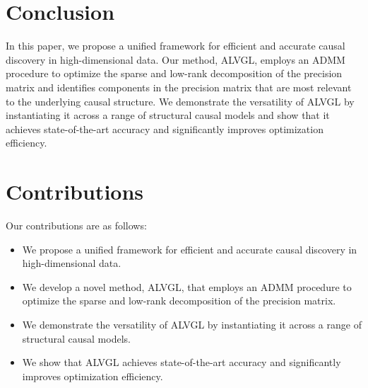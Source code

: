 \documentclass{article}
\begin{document}
        \section{Conclusion}
        In this paper, we propose a unified framework for efficient and accurate causal discovery in high-dimensional data. Our method, ALVGL, employs an ADMM procedure to optimize the sparse and low-rank decomposition of the precision matrix and identifies components in the precision matrix that are most relevant to the underlying causal structure. We demonstrate the versatility of ALVGL by instantiating it across a range of structural causal models and show that it achieves state-of-the-art accuracy and significantly improves optimization efficiency.

        \section{Contributions}
        Our contributions are as follows:

        \begin{itemize}
        \item We propose a unified framework for efficient and accurate causal discovery in high-dimensional data.
        \item We develop a novel method, ALVGL, that employs an ADMM procedure to optimize the sparse and low-rank decomposition of the precision matrix.
        \item We demonstrate the versatility of ALVGL by instantiating it across a range of structural causal models.
        \item We show that ALVGL achieves state-of-the-art accuracy and significantly improves optimization efficiency.
        \end{itemize}

        
        

        
\end{document}

